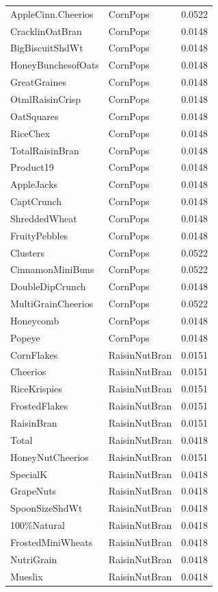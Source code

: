 \begin{longtable}{llr}
AppleCinn.Cheerios & CornPops & 0.0522 \\
CracklinOatBran & CornPops & 0.0148 \\
BigBiscuitShdWt & CornPops & 0.0148 \\
HoneyBunchesofOats & CornPops & 0.0148 \\
GreatGraines & CornPops & 0.0148 \\
OtmlRaisinCrisp & CornPops & 0.0148 \\
OatSquares & CornPops & 0.0148 \\
RiceChex & CornPops & 0.0148 \\
TotalRaisinBran & CornPops & 0.0148 \\
Product19 & CornPops & 0.0148 \\
AppleJacks & CornPops & 0.0148 \\
CaptCrunch & CornPops & 0.0148 \\
ShreddedWheat & CornPops & 0.0148 \\
FruityPebbles & CornPops & 0.0148 \\
Clusters & CornPops & 0.0522 \\
CinnamonMiniBuns & CornPops & 0.0522 \\
DoubleDipCrunch & CornPops & 0.0148 \\
MultiGrainCheerios & CornPops & 0.0522 \\
Honeycomb & CornPops & 0.0148 \\
Popeye & CornPops & 0.0148 \\
CornFlakes & RaisinNutBran & 0.0151 \\
Cheerios & RaisinNutBran & 0.0151 \\
RiceKrispies & RaisinNutBran & 0.0151 \\
FrostedFlakes & RaisinNutBran & 0.0151 \\
RaisinBran & RaisinNutBran & 0.0151 \\
Total & RaisinNutBran & 0.0418 \\
HoneyNutCheerios & RaisinNutBran & 0.0151 \\
SpecialK & RaisinNutBran & 0.0418 \\
GrapeNuts & RaisinNutBran & 0.0418 \\
SpoonSizeShdWt & RaisinNutBran & 0.0418 \\
100\%Natural & RaisinNutBran & 0.0418 \\
FrostedMiniWheats & RaisinNutBran & 0.0418 \\
NutriGrain & RaisinNutBran & 0.0418 \\
Mueslix & RaisinNutBran & 0.0418 \\

\end{longtable}
